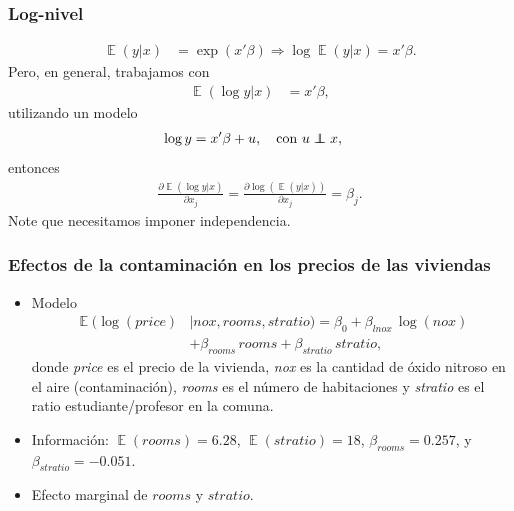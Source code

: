 \documentclass[t, compress, spanish, aspectratio=169]{beamer}
\DeclareMathOperator{\E}{\mathbb{E}}
\newcommand\independent{\protect\mathpalette{\protect\independenT}{\perp}}
\def\independenT#1#2{\mathrel{\rlap{$#1#2$}\mkern2mu{#1#2}}}
\begin{document}
    \begin{frame}
    		\frametitle{Log-nivel}
   	 	\begin{align*}
    			\E(y|x)&=\exp(x'\beta) \Rightarrow \log \E(y|x)=x'\beta.
    		\end{align*}
    		Pero, en general, trabajamos con
    		\begin{align*}
    			\E(\log y|x)&=x'\beta,
    		\end{align*}
   	 	utilizando un modelo
   	 	\begin{align*}
    			\log y&=x'\beta+u, \quad \text{con }u \independent x,
    		\end{align*}
    		entonces 
    		\begin{align*}
    			\frac{\partial \E(\log y|x) }{\partial x_j} = \frac{\partial \log (\E(y|x))}{\partial x_j} = \beta_j.
    		\end{align*}
   	 	Note que necesitamos imponer independencia.
    \end{frame}    
    
    
    \begin{frame}
        \frametitle{Efectos de la contaminaci\'on en los precios de las viviendas}
        \begin{itemize}
            \item Modelo
            \begin{align*}
            		\E(\log(price)&|nox, rooms, stratio) = \beta_0 +\beta_{lnox} \,\log(nox)\\
            		&+\beta_{rooms}\, rooms + \beta_{stratio} \,stratio,
            \end{align*}
            donde \emph{price} es el precio de la vivienda, \emph{nox} es la cantidad de \'oxido nitroso en el aire (contaminaci\'on), \emph{rooms} es el n\'umero de habitaciones y \emph{stratio} es el ratio estudiante/profesor en la comuna.
            \item Informaci\'on: $\E(rooms)=6.28$, $\E(stratio)=18$, $\beta_{rooms}=0.257$, y $\beta_{stratio}=-0.051$.
            \item  Efecto marginal de $rooms$ y $stratio$.
        \end{itemize}
    \end{frame}
    
       
\end{document}
